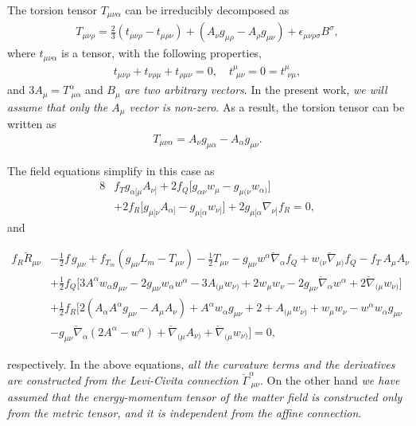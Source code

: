 \documentclass[aps,superscriptaddress, showpacs,preprintnumbers, superscriptaddress, nofootinbibt,twocolumn]{revtex4}
\begin{document}
The torsion tensor $T_{\mu\nu\alpha}$ can be irreducibly decomposed as
\begin{align}
T_{\mu\nu\rho}=\frac23(t_{\mu\nu\rho}-t_{\mu\rho\nu})+(A_\nu g_{\mu\rho}-A_\rho g_{\mu\nu})+\epsilon_{\mu\nu\rho\sigma}B^\sigma,
\end{align}
where $t_{\mu\nu\alpha}$ is a tensor, with the following properties,
\begin{align}
t_{\mu\nu\rho}+t_{\nu\rho\mu}+t_{\rho\mu\nu}=0,\quad t^\mu_{~\,\mu\nu}=0=t^\mu_{~\,\nu\mu},
\end{align}
and $3A_\mu=T^\alpha_{~\mu\alpha}$ and $B_\mu$ {\it are two arbitrary vectors}. In the present work, {\it we will assume that only the $A_\mu$ vector is non-zero}. As a result, the torsion tensor can be written as
\begin{align}
T_{\mu\nu\alpha}=A_\nu g_{\mu\alpha}-A_\alpha g_{\mu\nu}.
\end{align}

The field equations simplify in this case as
\begin{align}\label{affineq}
8&f_T g_{\alpha[\mu}A_{\nu]}+2f_Q\Big[g_{\alpha\nu}w_\mu-g_{\mu(\nu}w_{\alpha)}\Big]\nonumber\\&+2f_R\Big[g_{\mu[\nu}A_{\alpha]}-g_{\mu[\alpha}w_{\nu]}\Big]+2g_{\mu[\alpha}\nabla_{\nu]}f_R=0,
\end{align}
and
\begin{widetext}
\begin{align}\label{metriceq}
f_R \breve{R}_{\mu\nu}&-\frac12f\,g_{\mu\nu}+f_{T_m}(g_{\mu\nu}L_m-T_{\mu\nu})-\frac12T_{\mu\nu}-g_{\mu\nu}w^\alpha\breve{\nabla}_\alpha f_Q+w_{(\nu}\breve{\nabla}_{\mu)}f_Q-f_T\,A_\mu A_\nu\nonumber\\&
+\frac12f_Q\Big[3A^\alpha w_\alpha g_{\mu\nu}-2g_{\mu\nu}w_\alpha w^\alpha-3A_{(\mu}w_{\nu)}+2w_\mu w_\nu-2g_{\mu\nu}\breve{\nabla}_\alpha w^\alpha+2\breve{\nabla}_{(\mu}w_{\nu)}\Big]\nonumber\\&
+\frac12 f_R\Big[2(A_\alpha A^\alpha g_{\mu\nu}-A_\mu A_\nu)+A^\alpha w_\alpha g_{\mu\nu}+2+A_{(\mu}w_{\nu)}+w_\mu w_\nu-w^\alpha w_\alpha g_{\mu\nu}\nonumber\\&-g_{\mu\nu}\breve{\nabla}_\alpha(2A^\alpha-w^\alpha)+\breve{\nabla}_{(\mu}A_{\nu)}+\breve{\nabla}_{(\mu}w_{\nu)}\Big]=0,
\end{align}
\end{widetext}
respectively. In the above equations, {\it all the curvature terms and the derivatives are constructed from the Levi-Civita connection $\breve{\Gamma}^\alpha_{~\mu\nu}$}. On the other hand {\it we have assumed that the energy-momentum tensor of the  matter field is constructed only from the metric tensor, and it is independent from the affine connection}.
\end{document}

